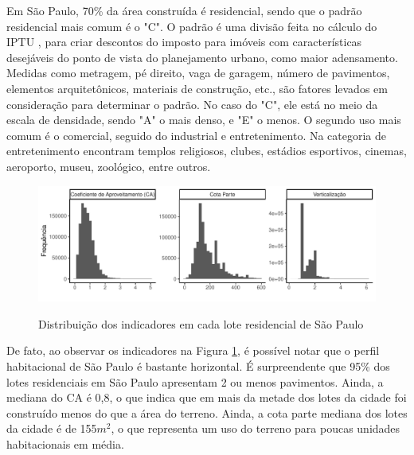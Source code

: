 Em São Paulo, 70\% da área construída é residencial, sendo que o padrão residencial mais comum é o "C". O padrão é uma divisão feita no cálculo do IPTU \cite{lei10235_1986}, para criar descontos do imposto para imóveis com características desejáveis do ponto de vista do planejamento urbano, como maior adensamento. Medidas como metragem, pé direito, vaga de garagem, número de pavimentos, elementos arquitetônicos, materiais de construção, etc., são fatores levados em consideração para determinar o padrão. No caso do "C", ele está no meio da escala de densidade, sendo "A" o mais denso, e "E" o menos. O segundo uso mais comum é o comercial, seguido do industrial e entretenimento. Na categoria de entretenimento encontram templos religiosos, clubes, estádios esportivos, cinemas, aeroporto, museu, zoológico, entre outros.

\begin{figure}[h]
    \centering
    \caption{Distribuição dos indicadores em cada lote residencial de São Paulo}
    \includegraphics[width = \linewidth]{imagens/indicadores.pdf}
    \label{fig:histogramas}
\end{figure}

De fato, ao observar os indicadores na Figura \ref{fig:histogramas}, é possível notar que o perfil habitacional de São Paulo é bastante horizontal. É surpreendente que 95\% dos lotes residenciais em São Paulo apresentam 2 ou menos pavimentos. Ainda, a mediana do CA é 0,8, o que indica que em mais da metade dos lotes da cidade foi construído menos do que a área do terreno. Ainda, a cota parte mediana dos lotes da cidade é de 155$m^2$, o que representa um uso do terreno para poucas unidades habitacionais em média. 


